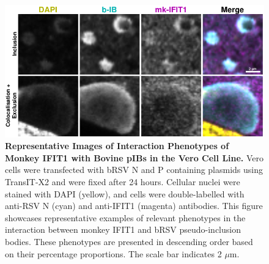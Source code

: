 \begin{figure}
    \centering
    \includegraphics[width=1\linewidth]{09. Chapter 4/Figs/01. pIB/02. IFIT1/09. i1-vero-bnbp.pdf}
    \caption[Representative Images of Interaction Phenotypes of Monkey IFIT1 with Bovine pIBs in the Vero Cell Line.]{\textbf{Representative Images of Interaction Phenotypes of Monkey IFIT1 with Bovine pIBs in the Vero Cell Line.} Vero cells were transfected with bRSV N and P containing plasmids using TransIT-X2 and were fixed after 24 hours. Cellular nuclei were stained with DAPI (yellow), and cells were double-labelled with anti-RSV N (cyan) and anti-IFIT1 (magenta) antibodies. This figure showcases representative examples of relevant phenotypes in the interaction between monkey IFIT1 and bRSV pseudo-inclusion bodies. These phenotypes are presented in descending order based on their percentage proportions. The scale bar indicates 2 \(\mu \mbox{m}\).}
    \label{fig:Representative Images of Interaction Phenotypes of Monkey IFIT1 with Bovine pIBs in the VERO Cell Line}
\end{figure}

